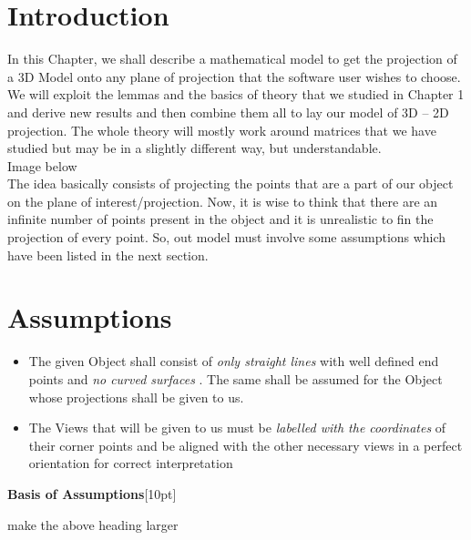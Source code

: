 \documentclass[12pt]{report}
\begin{document}
\section{Introduction}

In this Chapter, we shall describe a mathematical model to get the projection of a 3D Model onto any plane of projection that the software user wishes to choose. We will exploit the lemmas and the basics of theory that we studied in Chapter 1 and derive new results and then combine them all to lay our model of 3D – 2D projection. The whole theory will mostly work around matrices that we have studied but may be in a slightly different way, but understandable. \\

Image below \vspace{4cm}
\\

\hspace{1cm} The idea basically consists of projecting the points that are a part of our object on the plane of interest/projection. Now, it is wise to think that there are an infinite number of points present in the object and it is unrealistic to fin the projection of every point. So, out model must involve some assumptions which have been listed in the next section.\\





\section{Assumptions}

\begin{itemize}%
    \item 
  The given Object shall consist of \textit{ only straight lines } with well defined end points and \textit{ no curved surfaces } . The same shall be assumed for the Object whose projections shall be given to us.
    \item 
  The Views that will be given to us must be \textit{ labelled with the coordinates } of their corner points and be aligned with the other necessary views in a perfect orientation for correct interpretation
\end{itemize}


\textbf{Basis of Assumptions}[10pt]

{make the above heading larger}
\end{document}
